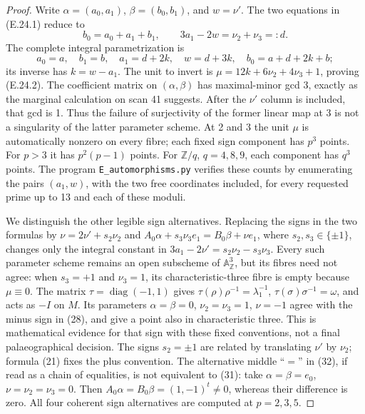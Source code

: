\begin{proof}
Write \(\alpha=(a_0,a_1)\), \(\beta=(b_0,b_1)\), and
\(w=\nu'\).  The two equations in (E.24.1) reduce to
\[
 b_0=a_0+a_1+b_1,\qquad 3a_1-2w=\nu_2+\nu_3=:d.
\]
The complete integral parametrization is
\[
 a_0=a,\quad b_1=b,\quad a_1=d+2k,\quad
 w=d+3k,\quad b_0=a+d+2k+b;
\]
its inverse has \(k=w-a_1\).  The unit to invert is
\(\mu=12k+6\nu_2+4\nu_3+1\), proving (E.24.2).
The coefficient matrix on \((\alpha,\beta)\) has maximal-minor
gcd 3, exactly as the marginal calculation on scan 41 suggests.
After the \(\nu'\) column is included, that gcd is 1.  Thus the
failure of surjectivity of the former linear map at 3 is not a
singularity of the latter parameter scheme.  At 2 and 3 the
unit \(\mu\) is automatically nonzero on every fibre; each fixed
sign component has \(p^3\) points.  For \(p>3\) it has
\(p^2(p-1)\) points.  For \(\mathbb Z/q\), \(q=4,8,9\), each
component has \(q^3\) points.  The program
\texttt{E\_automorphisms.py} verifies these counts by enumerating
the pairs \((a_1,w)\), with the two free coordinates included,
for every requested prime up to 13 and each of these moduli.

We distinguish the other legible sign alternatives.  Replacing
the signs in the two formulas by
\(\nu=2\nu'+s_2\nu_2\) and
\(A_0\alpha+s_3\nu_3e_1=B_0\beta+\nu e_1\),
where \(s_2,s_3\in\{\pm1\}\), changes only the integral constant
in \(3a_1-2\nu'=s_2\nu_2-s_3\nu_3\).
Every such parameter scheme remains an open subscheme of
\(\mathbb A^3_{\mathbb Z}\), but its fibres need not agree:
when \(s_3=+1\) and \(\nu_3=1\), its characteristic-three fibre
is empty because \(\mu\equiv0\).  The matrix
\(\tau=\operatorname{diag}(-1,1)\) gives
\(\tau(\rho)\rho^{-1}=\lambda_1^{-1}\),
\(\tau(\sigma)\sigma^{-1}=\omega\), and acts as \(-I\) on
\(M\).  Its parameters \(\alpha=\beta=0\),
\(\nu_2=\nu_3=1\), \(\nu=-1\) agree with the minus sign
in (28), and give a point also in characteristic three.
This is mathematical evidence for that sign with these fixed
conventions, not a final palaeographical decision.
The signs \(s_2=\pm1\) are related by translating \(\nu'\)
by \(\nu_2\); formula (21) fixes the plus convention.
The alternative middle ``\(=\)'' in (32), if read as a chain of
equalities, is not equivalent to (31): take
\(\alpha=\beta=e_0\), \(\nu=\nu_2=\nu_3=0\).
Then \(A_0\alpha=B_0\beta=(1,-1)^t\ne0\), whereas their
difference is zero.  All four coherent sign alternatives are
computed at \(p=2,3,5\).


\end{proof}
